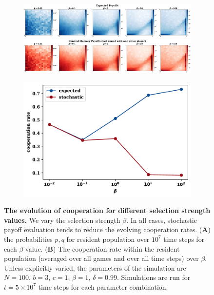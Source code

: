 \documentclass[11pt]{article}
\theoremstyle{plainCl1}
\theoremstyle{plainCl2}
\begin{document}
\begin{figure}[!htbp]
  \centering
  \begin{subfigure}{.65\textwidth}
    \centering
    \includegraphics[width=\textwidth]{static/expected_for_selection_strenght.pdf}
    \includegraphics[width=\textwidth]{static/stochastic_for_selection_strenght.pdf}
  \end{subfigure}%
  \begin{subfigure}{.35\textwidth}
    \vspace{.3cm}
    \includegraphics[width=\textwidth]{static/cooperation_rate_over_betas.pdf}
  \end{subfigure}
\caption{{\bf The evolution of cooperation for different selection strength values.}
We vary the selection strength $\beta$. In all cases, stochastic payoff
evaluation tends to reduce the evolving cooperation rates. ({\bf A}) the
probabilities \(p, q\) for resident population over \(10^7\) time steps for each
\(\beta\) value. ({\bf B}) The cooperation rate within the resident population
(averaged over all games and over all time steps) over \(\beta\).
Unless explicitly varied, the parameters of the simulation are $N\!=\!100$,
$b\!=\!3$, $c\!=\!1$, $\beta\!=\!1$, $\delta\!=\!0.99$. Simulations are run for
$t\!=\!5\times 10^7$ time steps for each parameter
combination.}\label{fig:cooperation_rate_over_betas}
\end{figure}
\end{document}
